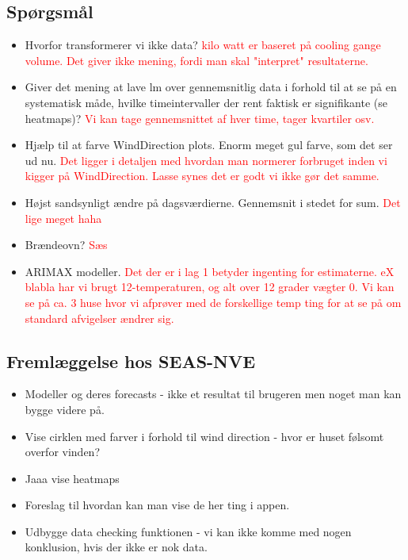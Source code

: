 \subsection{Spørgsmål}
\begin{itemize}
    \item Hvorfor transformerer vi ikke data? \textcolor{red}{kilo watt er baseret på cooling gange volume. Det giver ikke mening, fordi man skal "interpret" resultaterne.}
    \item Giver det mening at lave lm over gennemsnitlig data i forhold til at se på en systematisk måde, hvilke timeintervaller der rent faktisk er signifikante (se heatmaps)? \textcolor{red}{Vi kan tage gennemsnittet af hver time, tager kvartiler osv.}
    \item Hjælp til at farve WindDirection plots. Enorm meget gul farve, som det ser ud nu. \textcolor{red}{Det ligger i detaljen med hvordan man normerer forbruget inden vi kigger på WindDirection. Lasse synes det er godt vi ikke gør det samme.}
    \item Højst sandsynligt ændre på dagsværdierne. Gennemsnit i stedet for sum. \textcolor{red}{Det lige meget haha}
    \item Brændeovn? \textcolor{red}{Sæs}
    \item ARIMAX modeller. \textcolor{red}{Det der er i lag 1 betyder ingenting for estimaterne. eX blabla har vi brugt 12-temperaturen, og alt over 12 grader vægter 0. Vi kan se på ca. 3 huse hvor vi afprøver med de forskellige temp ting for at se på om standard afvigelser ændrer sig.}
\end{itemize} 

\subsection{Fremlæggelse hos SEAS-NVE}
\begin{itemize}
    \item Modeller og deres forecasts - ikke et resultat til brugeren men noget man kan bygge videre på. 
    \item Vise cirklen med farver i forhold til wind direction - hvor er huset følsomt overfor vinden? 
    \item Jaaa vise heatmaps
    \item Foreslag til hvordan kan man vise de her ting i appen.
    \item Udbygge data checking funktionen - vi kan ikke komme med nogen konklusion, hvis der ikke er nok data. 
\end{itemize}

